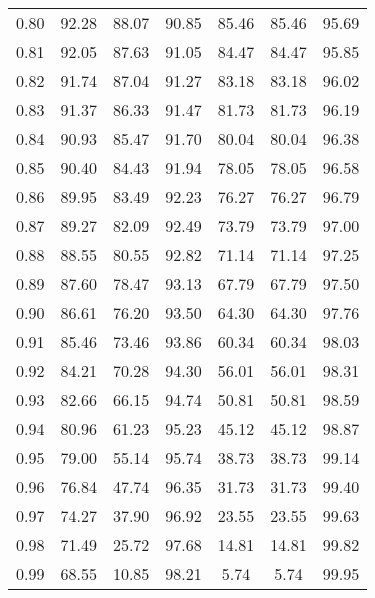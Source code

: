 \begin{tabular}{|c|c|c|c|c|c|c|}
      0.80 &     92.28 &     88.07 &      90.85 &   85.46 &      85.46 &         95.69 \\
      0.81 &     92.05 &     87.63 &      91.05 &   84.47 &      84.47 &         95.85 \\
      0.82 &     91.74 &     87.04 &      91.27 &   83.18 &      83.18 &         96.02 \\
      0.83 &     91.37 &     86.33 &      91.47 &   81.73 &      81.73 &         96.19 \\
      0.84 &     90.93 &     85.47 &      91.70 &   80.04 &      80.04 &         96.38 \\
      0.85 &     90.40 &     84.43 &      91.94 &   78.05 &      78.05 &         96.58 \\
      0.86 &     89.95 &     83.49 &      92.23 &   76.27 &      76.27 &         96.79 \\
      0.87 &     89.27 &     82.09 &      92.49 &   73.79 &      73.79 &         97.00 \\
      0.88 &     88.55 &     80.55 &      92.82 &   71.14 &      71.14 &         97.25 \\
      0.89 &     87.60 &     78.47 &      93.13 &   67.79 &      67.79 &         97.50 \\
      0.90 &     86.61 &     76.20 &      93.50 &   64.30 &      64.30 &         97.76 \\
      0.91 &     85.46 &     73.46 &      93.86 &   60.34 &      60.34 &         98.03 \\
      0.92 &     84.21 &     70.28 &      94.30 &   56.01 &      56.01 &         98.31 \\
      0.93 &     82.66 &     66.15 &      94.74 &   50.81 &      50.81 &         98.59 \\
      0.94 &     80.96 &     61.23 &      95.23 &   45.12 &      45.12 &         98.87 \\
      0.95 &     79.00 &     55.14 &      95.74 &   38.73 &      38.73 &         99.14 \\
      0.96 &     76.84 &     47.74 &      96.35 &   31.73 &      31.73 &         99.40 \\
      0.97 &     74.27 &     37.90 &      96.92 &   23.55 &      23.55 &         99.63 \\
      0.98 &     71.49 &     25.72 &      97.68 &   14.81 &      14.81 &         99.82 \\
      0.99 &     68.55 &     10.85 &      98.21 &    5.74 &       5.74 &         99.95 \\
\bottomrule
\end{tabular}
